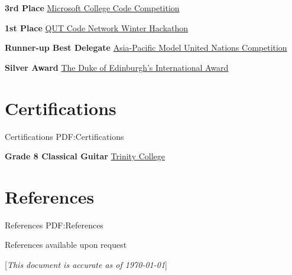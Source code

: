 \documentclass[a4paper,10pt,oneside]{article}
\newcommand{\CVNote}{This document is accurate as of {\today}}
\begin{document}
\begin{body}
\par \textbf{3rd Place}
\href{https://msft3c.com/}{Microsoft College Code Competition}
\hfill {}

\par \textbf{1st Place}
\href{https://codenetwork.co/hackathon-2017/}{QUT Code Network Winter Hackathon}
\hfill {}

\par \textbf{Runner-up Best Delegate}
\href{http://www.amunc.net/}{Asia-Pacific Model United Nations Competition} 
\hfill {}

\par \textbf{Silver Award}
\href{http://www.dukeofed.com.au/}{The Duke of Edinburgh’s International Award}
\hfill {}

\section
{Certifications}
{Certifications}
{PDF:Certifications}





\textbf{Grade 8 Classical Guitar}
\href{http://www.trinitycollege.com/}{Trinity College}
\hfill {}



\section
{References}
{References}
{PDF:References}



\par References available upon request

\end{body}


\begin{flushright}
\scriptsize%
[\textit{\CVNote}]%
\hspace{2.0mm}\null
\end{flushright}

\label{LastPage}~
\end{document}
